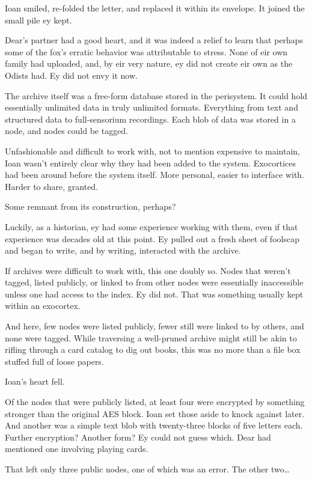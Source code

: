 Ioan smiled, re-folded the letter, and replaced it within its envelope. It joined the small pile ey kept.

Dear's partner had a good heart, and it was indeed a relief to learn that perhaps some of the fox's erratic behavior was attributable to stress. None of eir own family had uploaded, and, by eir very nature, ey did not create eir own as the Odists had. Ey did not envy it now.

The archive itself was a free-form database stored in the perisystem. It could hold essentially unlimited data in truly unlimited formats. Everything from text and structured data to full-sensorium recordings. Each blob of data was stored in a node, and nodes could be tagged.

Unfashionable and difficult to work with, not to mention expensive to maintain, Ioan wasn't entirely clear why they had been added to the system. Exocortices had been around before the system itself. More personal, easier to interface with. Harder to share, granted.

Some remnant from its construction, perhaps?

Luckily, as a historian, ey had some experience working with them, even if that experience was decades old at this point. Ey pulled out a fresh sheet of foolscap and began to write, and by writing, interacted with the archive.

If archives were difficult to work with, this one doubly so. Nodes that weren't tagged, listed publicly, or linked to from other nodes were essentially inaccessible unless one had access to the index. Ey did not. That was something usually kept within an exocortex.

And here, few nodes were listed publicly, fewer still were linked to by others, and none were tagged. While traversing a well-pruned archive might still be akin to rifling through a card catalog to dig out books, this was no more than a file box stuffed full of loose papers.

Ioan's heart fell.

Of the nodes that were publicly listed, at least four were encrypted by something stronger than the original AES block. Ioan set those aside to knock against later. And another was a simple text blob with twenty-three blocks of five letters each. Further encryption? Another form? Ey could not guess which. Dear had mentioned one involving playing cards.

That left only three public nodes, one of which was an error. The other two\ldots{}

